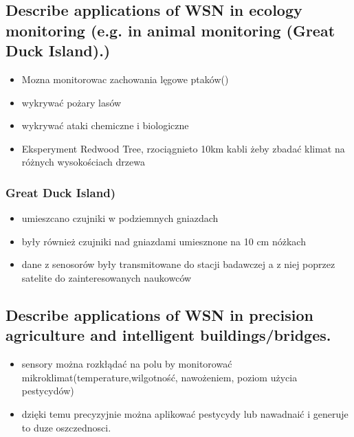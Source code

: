 \subsection{Describe applications of WSN in ecology monitoring (e.g. in animal monitoring (Great Duck Island).)}
\begin{itemize}
\item Mozna monitorowac zachowania lęgowe ptaków()
\item wykrywać pożary lasów
\item wykrywać ataki chemiczne i biologiczne
\item Eksperyment Redwood Tree, rzociągnieto 10km kabli żeby zbadać klimat na różnych wysokościach drzewa
\end{itemize}
\subsubsection{Great Duck Island)}
\begin{itemize}
\item umieszcano czujniki w podziemnych gniazdach
\item były również czujniki nad gniazdami umiesznone na 10 cm nóżkach
\item dane z senosorów były transmitowane do stacji badawczej a z niej poprzez satelite do zainteresowanych naukowców
\end{itemize}
\subsection{Describe applications of WSN in precision agriculture and intelligent buildings/bridges.}
\begin{itemize}
\item sensory można rozkłądać na polu by monitorować mikroklimat(temperature,wilgotność, nawożeniem, poziom użycia pestycydów)
\item dzięki temu precyzyjnie można aplikować pestycydy lub nawadnaić i generuje to duze oszczednosci.
\end{itemize}


